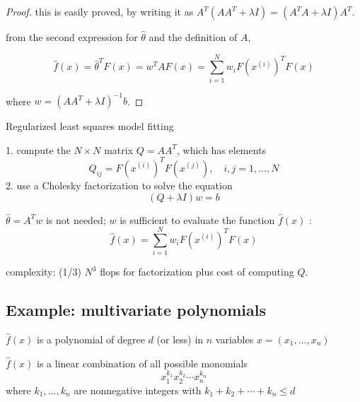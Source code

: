 \begin{proof}
    this is easily proved, by writing it as $A^{T}\left(A A^{T}+\lambda I\right)=\left(A^{T} A+\lambda I\right) A^{T}$.

    from the second expression for $\hat{\theta}$ and the definition of $A$,

    \begin{equation}
    \hat{f}(x)=\hat{\theta}^{T} F(x)=w^{T} A F(x)=\sum_{i=1}^{N} w_{i} F\left(x^{(i)}\right)^{T} F(x)
    \end{equation}

    where $w=\left(A A^{T}+\lambda I\right)^{-1} b$.
\end{proof}


\begin{algorithm}
    \caption{Regularized least squares model fitting}
    1. compute the $N \times N$ matrix $Q=A A^{T}$, which has elements
\begin{equation}
Q_{i j}=F\left(x^{(i)}\right)^{T} F\left(x^{(j)}\right), \quad i, j=1, \ldots, N
\end{equation}
2. use a Cholesky factorization to solve the equation
\begin{equation}
(Q+\lambda I) w=b
\end{equation}
\end{algorithm}

\begin{remark}
    $\hat{\theta}=A^{T} w$ is not needed; $w$ is sufficient to evaluate the function $\hat{f}(x)$ :
\begin{equation}
\hat{f}(x)=\sum_{i=1}^{N} w_{i} F\left(x^{(i)}\right)^{T} F(x)
\end{equation}
\end{remark}

complexity: (1/3) $N^{3}$ flops for factorization plus cost of computing $Q$.

\subsection{Example: multivariate polynomials}

\begin{definition}
    $\hat{f}(x)$ is a polynomial of degree $d$ (or less) in $n$ variables $x=\left(x_{1}, \ldots, x_{n}\right)$

    $\hat{f}(x)$ is a linear combination of all possible monomials
    \begin{equation}
    x_{1}^{k_{1}} x_{2}^{k_{2}} \cdots x_{n}^{k_{n}}
    \end{equation}
    where $k_{1}, \ldots, k_{n}$ are nonnegative integers with $k_{1}+k_{2}+\cdots+k_{n} \leq d$
\end{definition}

